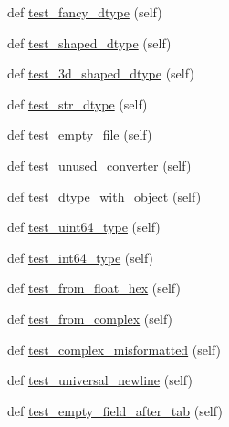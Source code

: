 \begin{DoxyCompactItemize}
\item 
def \hyperlink{classnumpy_1_1lib_1_1tests_1_1test__io_1_1TestLoadTxt_a54356eb8e1bad88d065b7fb31027f2fa}{test\+\_\+fancy\+\_\+dtype} (self)
\item 
def \hyperlink{classnumpy_1_1lib_1_1tests_1_1test__io_1_1TestLoadTxt_a6fc205bd84dd68d2c7aaad7192ebe457}{test\+\_\+shaped\+\_\+dtype} (self)
\item 
def \hyperlink{classnumpy_1_1lib_1_1tests_1_1test__io_1_1TestLoadTxt_a1a274d0411c79f035074baacd77ef157}{test\+\_\+3d\+\_\+shaped\+\_\+dtype} (self)
\item 
def \hyperlink{classnumpy_1_1lib_1_1tests_1_1test__io_1_1TestLoadTxt_a6f4f1a0f5b434ed8c51a07e29245d631}{test\+\_\+str\+\_\+dtype} (self)
\item 
def \hyperlink{classnumpy_1_1lib_1_1tests_1_1test__io_1_1TestLoadTxt_ad0ae61d5f763f55d8aed947a110dc9fc}{test\+\_\+empty\+\_\+file} (self)
\item 
def \hyperlink{classnumpy_1_1lib_1_1tests_1_1test__io_1_1TestLoadTxt_a3b99cb381af6448c80ca9d7e46002b6c}{test\+\_\+unused\+\_\+converter} (self)
\item 
def \hyperlink{classnumpy_1_1lib_1_1tests_1_1test__io_1_1TestLoadTxt_ac3db30d308609f418b73bb8e7b1e1f87}{test\+\_\+dtype\+\_\+with\+\_\+object} (self)
\item 
def \hyperlink{classnumpy_1_1lib_1_1tests_1_1test__io_1_1TestLoadTxt_a1bc3ba0531fa8dab066a26fd52d4f7bd}{test\+\_\+uint64\+\_\+type} (self)
\item 
def \hyperlink{classnumpy_1_1lib_1_1tests_1_1test__io_1_1TestLoadTxt_ae82137688f533042ea65803603dc3308}{test\+\_\+int64\+\_\+type} (self)
\item 
def \hyperlink{classnumpy_1_1lib_1_1tests_1_1test__io_1_1TestLoadTxt_a4da1ad57c3d852beb509662c9bd61e94}{test\+\_\+from\+\_\+float\+\_\+hex} (self)
\item 
def \hyperlink{classnumpy_1_1lib_1_1tests_1_1test__io_1_1TestLoadTxt_a5dd597acf419514395ef37b2fc8784b5}{test\+\_\+from\+\_\+complex} (self)
\item 
def \hyperlink{classnumpy_1_1lib_1_1tests_1_1test__io_1_1TestLoadTxt_a93745e9bcd535f14140cab6706ed78de}{test\+\_\+complex\+\_\+misformatted} (self)
\item 
def \hyperlink{classnumpy_1_1lib_1_1tests_1_1test__io_1_1TestLoadTxt_ae213ff6b30e9a665c08154d476002ab0}{test\+\_\+universal\+\_\+newline} (self)
\item 
def \hyperlink{classnumpy_1_1lib_1_1tests_1_1test__io_1_1TestLoadTxt_a8d3c25ce61ad14f20e08ab91b82dc521}{test\+\_\+empty\+\_\+field\+\_\+after\+\_\+tab} (self)

\end{DoxyCompactItemize}
